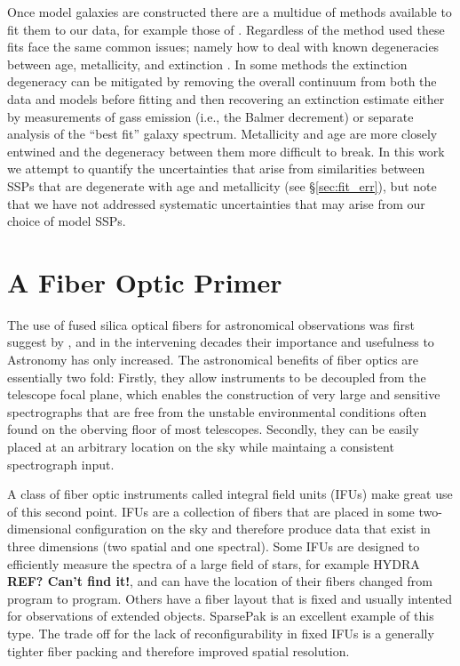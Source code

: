 Once model galaxies are constructed there are a multidue of methods
available to fit them to our data, for example those of
\citep{Cappellari04,Tojeiro07,Chen12,CidFernandes05,Ocvirk06,Wilkinson15,Sanchez16}. Regardless
of the method used these fits face the same common issues; namely how
to deal with known degeneracies between age, metallicity, and
extinction \citep{Oconnel76,Aaronson78,Worthey94,dePaz02}. In some
methods the extinction degeneracy can be mitigated by removing the
overall continuum from both the data and models before fitting
\citep[e.g.,][]{Ocvirk06,Wilkinson15} and then recovering an
extinction estimate either by measurements of gass emission (i.e., the
Balmer decrement) or separate analysis of the ``best fit'' galaxy
spectrum. Metallicity and age are more closely entwined and the
degeneracy between them more difficult to break. In this work we
attempt to quantify the uncertainties that arise from similarities
between SSPs that are degenerate with age and metallicity (see
\S\ref{sec:fit_err}), but note that we have not addressed systematic
uncertainties that may arise from our choice of model SSPs.

\section{A Fiber Optic Primer}

The use of fused silica optical fibers for astronomical observations
was first suggest by \citet{Angel77}, and in the intervening decades
their importance and usefulness to Astronomy has only increased. The
astronomical benefits of fiber optics are essentially two fold:
Firstly, they allow instruments to be decoupled from the telescope
focal plane, which enables the construction of very large and
sensitive spectrographs that are free from the unstable environmental
conditions often found on the oberving floor of most
telescopes. Secondly, they can be easily placed at an arbitrary
location on the sky while maintaing a consistent spectrograph input.

A class of fiber optic instruments called integral field units (IFUs)
make great use of this second point. IFUs are a collection of fibers
that are placed in some two-dimensional configuration on the sky and
therefore produce data that exist in three dimensions (two spatial and
one spectral). Some IFUs are designed to efficiently measure the
spectra of a large field of stars, for example HYDRA {\bf REF? Can't
  find it!}, and can have the location of their fibers changed from
program to program. Others have a fiber layout that is fixed and
usually intented for observations of extended objects. SparsePak
\citep{Bershady04,Bershady05} is an excellent example of this
type. The trade off for the lack of reconfigurability in fixed IFUs is
a generally tighter fiber packing and therefore improved spatial
resolution.

